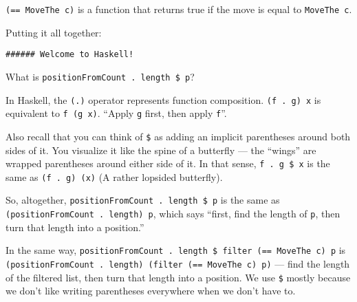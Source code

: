 \documentclass[]{article}
\newenvironment{Shaded}{}{}
\newcommand{\KeywordTok}[1]{\textcolor[rgb]{0.00,0.44,0.13}{\textbf{{#1}}}}
\newcommand{\DataTypeTok}[1]{\textcolor[rgb]{0.56,0.13,0.00}{{#1}}}
\newcommand{\OtherTok}[1]{\textcolor[rgb]{0.00,0.44,0.13}{{#1}}}
\newcommand{\FunctionTok}[1]{\textcolor[rgb]{0.02,0.16,0.49}{{#1}}}
\newcommand{\NormalTok}[1]{{#1}}
\begin{document}
\texttt{(==\ MoveThe\ c)} is a function that returns true if the move is equal
to \texttt{MoveThe\ c}.

Putting it all together:

\begin{Shaded}
\end{Shaded}

\begin{verbatim}
###### Welcome to Haskell!
\end{verbatim}

What is \texttt{positionFromCount\ .\ length\ \$\ p}?

In Haskell, the \texttt{(.)} operator represents function composition.
\texttt{(f\ .\ g)\ x} is equivalent to \texttt{f\ (g\ x)}. ``Apply \texttt{g}
first, then apply \texttt{f}''.

Also recall that you can think of \texttt{\$} as adding an implicit parentheses
around both sides of it. You visualize it like the spine of a butterfly --- the
``wings'' are wrapped parentheses around either side of it. In that sense,
\texttt{f\ .\ g\ \$\ x} is the same as \texttt{(f\ .\ g)\ (x)} (A rather
lopsided butterfly).

So, altogether, \texttt{positionFromCount\ .\ length\ \$\ p} is the same as
\texttt{(positionFromCount\ .\ length)\ p}, which says ``first, find the length
of \texttt{p}, then turn that length into a position.''

In the same way,
\texttt{positionFromCount\ .\ length\ \$\ filter\ (==\ MoveThe\ c)\ p} is
\texttt{(positionFromCount\ .\ length)\ (filter\ (==\ MoveThe\ c)\ p)} --- find
the length of the filtered list, then turn that length into a position. We use
\texttt{\$} mostly because we don't like writing parentheses everywhere when we
don't have to.
\end{document}
